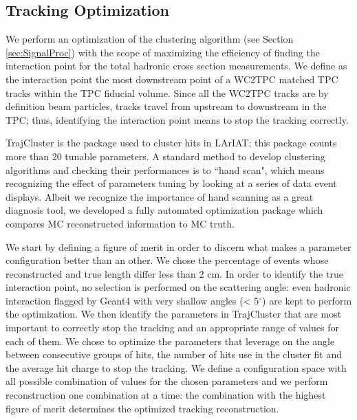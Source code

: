 \subsection{Tracking Optimization}\label{ch:TrackOptimization}
We perform an optimization of the clustering algorithm (see Section \ref{sec:SignalProc}) with the scope of maximizing the efficiency of finding the interaction point for the total hadronic cross section measurements. We define as the interaction point the most downstream point of a WC2TPC matched TPC tracks within the TPC fiducial volume. Since all the WC2TPC tracks are by definition beam particles, tracks travel from upstream to downstream in the TPC; thus, identifying the interaction point means to stop the tracking correctly. 

TrajCluster is the package used to cluster hits in LArIAT; this package counts more than 20 tunable parameters. A standard method to develop clustering algorithms and checking their performances is to ``hand scan", which means recognizing the effect of parameters tuning by looking at a series of data event displays. Albeit we recognize the importance of hand scanning as a great diagnosis tool, we developed a fully automated optimization package which compares MC reconstructed information to MC truth. 

We start by defining a figure of merit in order to discern what makes a parameter configuration better than an other. We chose the percentage of events whose reconstructed and true length differ less than 2 cm. In order to identify the true interaction point, no selection is performed on the scattering angle: even hadronic interaction flagged by Geant4 with very shallow angles (< 5$^\circ$) are kept to perform the optimization.
We then identify the parameters in TrajCluster that are most important to  correctly stop  the tracking and an appropriate range of values for each of them. We chose to optimize the parameters that leverage on the angle between consecutive groups of hits, the number of hits use in the cluster fit and the average hit charge to stop the tracking. We define a configuration space with all  possible combination of values for the chosen parameters and we perform reconstruction one combination at a time: the combination with the highest figure of merit determines the optimized tracking reconstruction.

